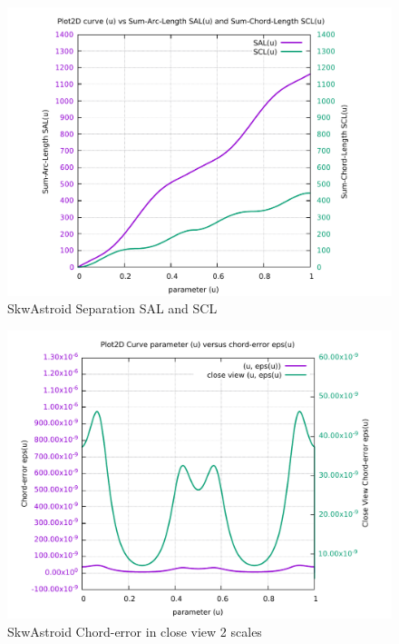 \begin{figure}
	\caption     {SkwAstroid Separation SAL and SCL}
	\label{08-img-SkwAstroid-Separation-SAL-and-SCL.pdf}
	\includegraphics[width=1.00\textwidth]{Chap4/appendix/app-SkwAstroid/plots/08-img-SkwAstroid-Separation-SAL-and-SCL.pdf}
\end{figure}

\clearpage
\pagebreak

\begin{figure}
	\caption     {SkwAstroid Chord-error in close view 2 scales}
	\label{09-img-SkwAstroid-Chord-error-in-close-view-2-scales.pdf}
	\includegraphics[width=1.00\textwidth]{Chap4/appendix/app-SkwAstroid/plots/09-img-SkwAstroid-Chord-error-in-close-view-2-scales.pdf}
\end{figure}

